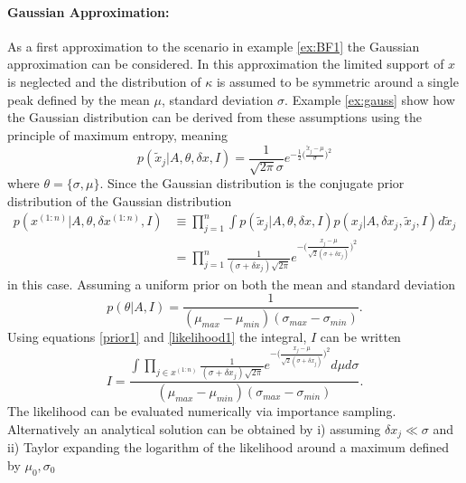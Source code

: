 \begin{example}
	\paragraph{Gaussian Approximation:} As a first approximation to the scenario in example \ref{ex:BF1} the Gaussian approximation can be considered. In this approximation the limited support of $x$ is neglected and the distribution of $\kappa$ is assumed to be symmetric around a single peak defined by the mean $\mu$, standard deviation $\sigma$. Example \ref{ex:gauss} show how the Gaussian distribution can be derived from these assumptions using the principle of maximum entropy, meaning\label{ex:gauss2}
	\begin{equation}
		p(\tilde{x}_j|A,\theta,\delta x, I) = \frac{1}{\sqrt{2\pi}\sigma}e^{-\frac{1}{2}\big(\frac{\tilde{x}_j-\mu}{\sigma}\big)^2}
	\end{equation}
	where $\theta = \{\sigma,\mu\}$. Since the Gaussian distribution is the conjugate prior distribution of the Gaussian distribution
	\begin{equation}
		\begin{split}
			p(x^{(1:n)}|A,\theta,\delta x^{(1:n)}, I) &\equiv \prod_{j=1}^{n}\int p(\tilde{x}_j|A,\theta,\delta x, I)p(x_j|A,\delta x_j, \tilde{x}_j, I)d \tilde{x}_j\\
			&= \prod_{j=1}^n\frac{1}{(\sigma+\delta x_j)\sqrt{2\pi}}e^{-\big(\frac{x_j-\mu}{\sqrt{2}(\sigma+\delta x_j)}\big)^2}
		\end{split}
		\label{likelihood1}
	\end{equation}
	in this case. Assuming a uniform prior on both the mean and standard deviation
	\begin{equation}
		p(\theta|A,I) = \frac{1}{(\mu_{max}-\mu_{min})(\sigma_{max}-\sigma_{min})}.
		\label{prior1}
	\end{equation}
	Using equations \eqref{prior1} and \eqref{likelihood1} the integral, $I$ can be written
	\begin{equation}
		I = \frac{\int \prod_{j\in x^{(1:n)}}\frac{1}{(\sigma+\delta x_j)\sqrt{2\pi}}e^{-\big(\frac{x_{j}-\mu}{\sqrt{2}(\sigma+\delta x_j)}\big)^2} d\mu d\sigma}{(\mu_{max}-\mu_{min})(\sigma_{max}-\sigma_{min})}.
	\end{equation}
	The likelihood can be evaluated numerically via importance sampling. Alternatively an analytical solution can be obtained by i) assuming $\delta x_j\ll \sigma$ and ii) Taylor expanding the logarithm of the likelihood around a maximum defined by $\mu_0,\sigma_0$~\citep{Sivia2006}

\end{example}
